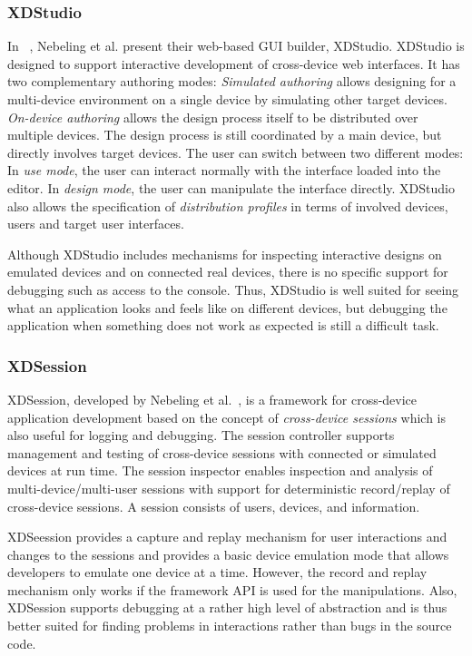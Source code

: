 \subsubsection{XDStudio}

In ~\cite{xdstudio2014}, Nebeling et al. present their web-based GUI builder, XDStudio. XDStudio is designed to support interactive development of cross-device web interfaces. It has two complementary authoring modes: \emph{Simulated authoring} allows designing for a multi-device environment on a single device by simulating other target devices. \emph{On-device authoring} allows the design process itself to be distributed over multiple devices. The design process is still coordinated by a main device, but directly involves target devices. The user can switch between two different modes: In \emph{use mode}, the user can interact normally with the interface loaded into the editor. In \emph{design mode}, the user can manipulate the interface directly. XDStudio also allows the specification of \emph{distribution profiles} in terms of involved devices, users and target user interfaces.

Although XDStudio includes mechanisms for inspecting interactive designs on emulated devices and on connected real devices, there is no specific support for debugging such as access to the console. Thus, XDStudio is well suited for seeing what an application looks and feels like on different devices, but debugging the application when something does not work as expected is still a difficult task.

\subsubsection{XDSession}

XDSession, developed by Nebeling et al.~\cite{xdsession2015}, is a framework for cross-device application development based on the concept of \emph{cross-device sessions} which is also useful for logging and debugging. The session controller supports management and testing of cross-device sessions with connected or simulated devices at run time. The session inspector enables inspection and analysis of multi-device/multi-user sessions with support for deterministic record/replay of cross-device sessions. A session consists of users, devices, and information.

XDSeession provides a capture and replay mechanism for user interactions and changes to the sessions and provides a basic device emulation mode that allows developers to emulate one device at a time. However, the record and replay mechanism only works if the framework API is used for the manipulations. Also, XDSession supports debugging at a rather high level of abstraction and is thus better suited for finding problems in interactions rather than bugs in the source code.

